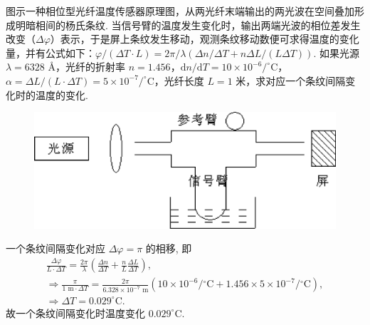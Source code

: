 \documentclass{assignment}
\begin{document}
\begin{prob}
    图示一种相位型光纤温度传感器原理图，从两光纤末端输出的两光波在空间叠加形成明暗相间的杨氏条纹. 当信号臂的温度发生变化时，输出两端光波的相位差发生改变（$\Delta\varphi$）表示，于是屏上条纹发生移动，观测条纹移动数便可求得温度的变化量，并有公式如下：$\varphi/(\Delta T\cdot L)=2\pi/\lambda(\Delta n/\Delta T+n\Delta L/(L\Delta T))$. 如果光源 $\lambda=6328$ \AA，光纤的折射率 $n=1.456$，$\mathrm{d}n/\mathrm{d}T=10\times 10^{-6}/^{\circ}$C，$\alpha=\Delta L/(L\cdot\Delta T)=5\times 10^{-7}/^{\circ}$C，光纤长度 $L=1$ 米，求对应一个条纹间隔变化时的温度的变化.
    \begin{figure}[h]
        \centering
        \includegraphics[width=.5\columnwidth]{4-1.png}
    \end{figure}
\end{prob}
\begin{sol}
    一个条纹间隔变化对应 $\Delta\varphi=\pi$ 的相移, 即
    \begin{gather}
        \frac{\Delta\varphi}{L\cdot\Delta T}=\frac{2\pi}{\lambda}\left(\frac{\Delta n}{\Delta T}+\frac{n}{L}\frac{\Delta L}{\Delta T}\right),\\
        \Longrightarrow\frac{\pi}{1\text{ m}\cdot\Delta T}=\frac{2\pi}{6.328\times 10^{-7}\text{ m}}\left(10\times 10^{-6}/{}^\circ\text{C}+1.456\times 5\times 10^{-7}/{}^{\circ}\text{C}\right),\\
        \Longrightarrow\Delta T=0.029^{\circ}\text{C}.
    \end{gather}
    故一个条纹间隔变化时温度变化 $0.029^{\circ}$C.
\end{sol}
\end{document}
